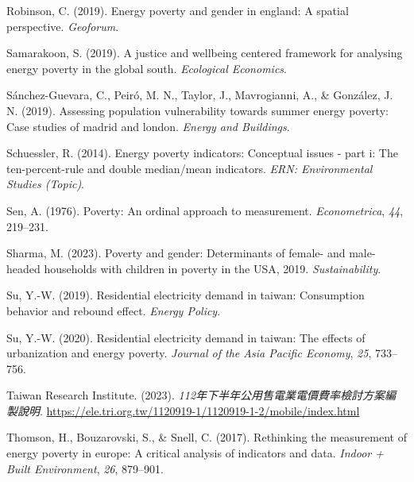 \documentclass[
  twoside,
  openright,
  degree    = master,               %
  language  = english,              %
  fontset   = overleaf,             %
  watermark = true,                 %
  doi       = true,                 %
]{ntuthesis}
\newlength{\cslhangindent}
\newlength{\cslentryspacingunit} %
\newenvironment{CSLReferences}[2] %
 {%
  \setlength{\parindent}{0pt}
  \ifodd #1
  \let\oldpar\par
  \def\par{\hangindent=\cslhangindent\oldpar}
  \fi
  \setlength{\parskip}{#2\cslentryspacingunit}
 }%
 {}
\begin{document}
\begin{CSLReferences}{1}{0}
\leavevmode{}%
Robinson, C. (2019). Energy poverty and gender in england: A spatial
perspective. \emph{Geoforum}.

\leavevmode{}%
Samarakoon, S. (2019). A justice and wellbeing centered framework for
analysing energy poverty in the global south. \emph{Ecological
Economics}.

\leavevmode{}%
Sánchez-Guevara, C., Peiró, M. N., Taylor, J., Mavrogianni, A., \&
González, J. N. (2019). Assessing population vulnerability towards
summer energy poverty: Case studies of madrid and london. \emph{Energy
and Buildings}.

\leavevmode{}%
Schuessler, R. (2014). Energy poverty indicators: Conceptual issues -
part i: The ten-percent-rule and double median/mean indicators.
\emph{ERN: Environmental Studies (Topic)}.

\leavevmode{}%
Sen, A. (1976). Poverty: An ordinal approach to measurement.
\emph{Econometrica}, \emph{44}, 219--231.

\leavevmode{}%
Sharma, M. (2023). Poverty and gender: Determinants of female- and
male-headed households with children in poverty in the USA, 2019.
\emph{Sustainability}.

\leavevmode{}%
Su, Y.-W. (2019). Residential electricity demand in taiwan: Consumption
behavior and rebound effect. \emph{Energy Policy}.

\leavevmode{}%
Su, Y.-W. (2020). Residential electricity demand in taiwan: The effects
of urbanization and energy poverty. \emph{Journal of the Asia Pacific
Economy}, \emph{25}, 733--756.

\leavevmode{}%
Taiwan Research Institute. (2023).
\emph{112年下半年公用售電業電價費率檢討方案編製說明}.
\url{https://ele.tri.org.tw/1120919-1/1120919-1-2/mobile/index.html}

\leavevmode{}%
Thomson, H., Bouzarovski, S., \& Snell, C. (2017). Rethinking the
measurement of energy poverty in europe: A critical analysis of
indicators and data. \emph{Indoor + Built Environment}, \emph{26},
879--901.


\end{CSLReferences}
\end{document}
